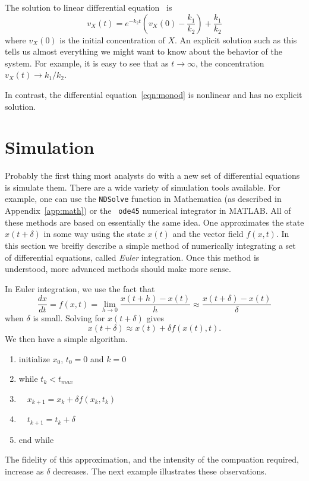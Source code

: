 \begin{example} \label{ex:gene-exp-sol}
The solution to linear differential equation~ is 
%
\begin{equation}\label{eqn:gene-exp-sol}
v_X(t) = e^{-k_2 t} \left ( v_X(0) - \frac{k_1}{k_2} \right ) + \frac{k_1}{k_2}
\end{equation}
%
where $v_X(0)$ is the initial concentration of $X$. An explicit
solution such as this tells us almost everything we might want to know
about the behavior of the system. For example, it is easy to see that
as $t \rightarrow \infty$, the concentration $v_X(t) \rightarrow
k_1/k_2$.

In contrast, the differential equation~\ref{eqn:monod} is nonlinear
and has no explicit solution.  \enx
\end{example}

\section{Simulation}

Probably the first thing most analysts do with a new set of
differential equations is simulate them. There are a wide variety of
simulation tools available. For example, one can use the {\tt NDSolve} function
in Mathematica (as described in Appendix~\ref{app:math}) or the {\tt
  ode45} numerical integrator in MATLAB. All of these methods are
based on essentially the same idea. One approximates the state
$x(t+\delta)$ in some way using the state $x(t)$ and the vector field
$f(x,t)$. In this section we breifly describe a simple method of
numerically integrating a set of differential equations, called {\em
  Euler} integration. Once this method is understood, more advanced
methods should make more sense.

In Euler integration, we use the fact that
%
$$
\frac{dx}{dt} = f(x,t) = \lim_{h \rightarrow 0} \frac{x(t+h) - x(t)}{h} \approx  \frac{x(t+\delta) - x(t)}{\delta}
$$
%
when $\delta$ is small. Solving for $x(t+\delta)$ gives
%
\begin{equation}\label{eqn:euler}
x(t+\delta) \approx x(t) + \delta f(x(t),t) .
\end{equation}
%
We then have a simple algorithm.
%
\begin{enumerate}
\item initialize $x_0$, $t_0=0$ and $k=0$
\item while $t_k<t_\mathit{max}$
\item \ \ $x_{k+1} = x_k + \delta f(x_k,t_k)$
\item \ \ $t_{k+1} = t_k + \delta$
\item end while
\end{enumerate}
%
The fidelity of this approximation, and the intensity of the
compuation required, increase as $\delta$ decreases. The next example
illustrates these observations.

